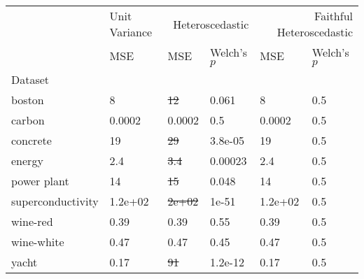 \begin{tabular}{l|l|ll|ll}
\toprule
 & Unit Variance & \multicolumn{2}{r}{Heteroscedastic} & \multicolumn{2}{r}{Faithful Heteroscedastic} \\
 & MSE & MSE & Welch's $p$ & MSE & Welch's $p$ \\
Dataset &  &  &  &  &  \\
\midrule
boston & 8 & \sout{12} & 0.061 & 8 & 0.5 \\
carbon & 0.0002 & 0.0002 & 0.5 & 0.0002 & 0.5 \\
concrete & 19 & \sout{29} & 3.8e-05 & 19 & 0.5 \\
energy & 2.4 & \sout{3.4} & 0.00023 & 2.4 & 0.5 \\
power plant & 14 & \sout{15} & 0.048 & 14 & 0.5 \\
superconductivity & 1.2e+02 & \sout{2e+02} & 1e-51 & 1.2e+02 & 0.5 \\
wine-red & 0.39 & 0.39 & 0.55 & 0.39 & 0.5 \\
wine-white & 0.47 & 0.47 & 0.45 & 0.47 & 0.5 \\
yacht & 0.17 & \sout{91} & 1.2e-12 & 0.17 & 0.5 \\
\bottomrule
\end{tabular}
